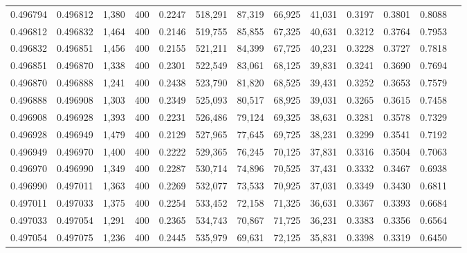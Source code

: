 \begin{tabular}{rrrrrrrrrrrrr}
0.496794 & 0.496812 &  1,380 & 400 &                                     0.2247 & 518,291 &  87,319 &  66,925 &  41,031 & 0.3197 & 0.3801 & 0.8088 \\
0.496812 & 0.496832 &  1,464 & 400 &                                     0.2146 & 519,755 &  85,855 &  67,325 &  40,631 & 0.3212 & 0.3764 & 0.7953 \\
0.496832 & 0.496851 &  1,456 & 400 &                                     0.2155 & 521,211 &  84,399 &  67,725 &  40,231 & 0.3228 & 0.3727 & 0.7818 \\
0.496851 & 0.496870 &  1,338 & 400 &                                     0.2301 & 522,549 &  83,061 &  68,125 &  39,831 & 0.3241 & 0.3690 & 0.7694 \\
0.496870 & 0.496888 &  1,241 & 400 &                                     0.2438 & 523,790 &  81,820 &  68,525 &  39,431 & 0.3252 & 0.3653 & 0.7579 \\
0.496888 & 0.496908 &  1,303 & 400 &                                     0.2349 & 525,093 &  80,517 &  68,925 &  39,031 & 0.3265 & 0.3615 & 0.7458 \\
0.496908 & 0.496928 &  1,393 & 400 &                                     0.2231 & 526,486 &  79,124 &  69,325 &  38,631 & 0.3281 & 0.3578 & 0.7329 \\
0.496928 & 0.496949 &  1,479 & 400 &                                     0.2129 & 527,965 &  77,645 &  69,725 &  38,231 & 0.3299 & 0.3541 & 0.7192 \\
0.496949 & 0.496970 &  1,400 & 400 &                                     0.2222 & 529,365 &  76,245 &  70,125 &  37,831 & 0.3316 & 0.3504 & 0.7063 \\
0.496970 & 0.496990 &  1,349 & 400 &                                     0.2287 & 530,714 &  74,896 &  70,525 &  37,431 & 0.3332 & 0.3467 & 0.6938 \\
0.496990 & 0.497011 &  1,363 & 400 &                                     0.2269 & 532,077 &  73,533 &  70,925 &  37,031 & 0.3349 & 0.3430 & 0.6811 \\
0.497011 & 0.497033 &  1,375 & 400 &                                     0.2254 & 533,452 &  72,158 &  71,325 &  36,631 & 0.3367 & 0.3393 & 0.6684 \\
0.497033 & 0.497054 &  1,291 & 400 &                                     0.2365 & 534,743 &  70,867 &  71,725 &  36,231 & 0.3383 & 0.3356 & 0.6564 \\
0.497054 & 0.497075 &  1,236 & 400 &                                     0.2445 & 535,979 &  69,631 &  72,125 &  35,831 & 0.3398 & 0.3319 & 0.6450 \\

\end{tabular}
